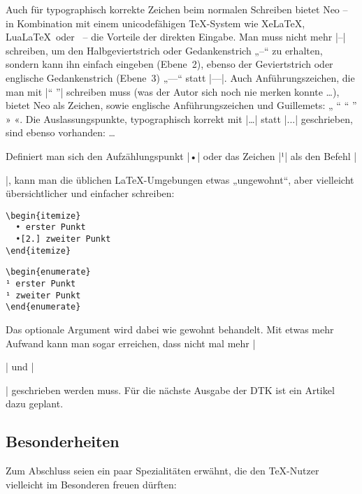 \documentclass[ngerman]{dtk}
\newcommand\LuaLaTeX{Lua\LaTeX}
\newcommand\XeLaTeX{Xe\LaTeX}
\begin{document}
{{Auch für typographisch korrekte Zeichen beim normalen Schreiben bietet Neo – in Kombination mit einem unicodefähigen \TeX-System wie \XeLaTeX, \LuaLaTeX\ oder \ConTeXt\ – die Vorteile der direkten Eingabe. Man muss nicht mehr |--| schreiben, um den Halbgeviertstrich oder Gedankenstrich „–“ zu erhalten, sondern kann ihn einfach eingeben (Ebene~2), ebenso der Geviertstrich oder englische Gedankenstrich (Ebene~3) „—“ statt |---|. Auch Anführungszeichen, die man mit  |"` "'| schreiben muss (was der Autor sich noch nie merken konnte \dots{}), bietet Neo als Zeichen, sowie englische Anführungszeichen und Guillemets: „ “ “ ”  » «. Die Auslassungspunkte, typographisch korrekt mit |\dots| statt |...| geschrieben, sind ebenso vorhanden: …

Definiert man sich den Aufzählungspunkt |•| oder das Zeichen |¹| als den Befehl |\item|, kann man die üblichen \LaTeX-Umgebungen etwas „ungewohnt“, aber vielleicht übersichtlicher und einfacher schreiben:

\begin{minipage}{.4\textwidth}
\begin{verbatim}
\begin{itemize}
  • erster Punkt
  •[2.] zweiter Punkt
\end{itemize} 
\end{verbatim}
\end{minipage}
\hfill
\begin{minipage}{.4\textwidth}
\begin{verbatim}
\begin{enumerate}
¹ erster Punkt
¹ zweiter Punkt
\end{enumerate} 
\end{verbatim}
\end{minipage}

Das optionale Argument wird dabei wie gewohnt behandelt. Mit etwas mehr Aufwand kann man sogar erreichen, dass nicht mal mehr |\begin{itemize}| und |\end{itemize}| geschrieben werden muss. Für die nächste Ausgabe der DTK ist ein Artikel dazu geplant.

\subsection{Besonderheiten}
Zum Abschluss seien ein paar Spezialitäten erwähnt, die den \TeX-Nutzer vielleicht im Besonderen freuen dürften:

}}
\end{document}
